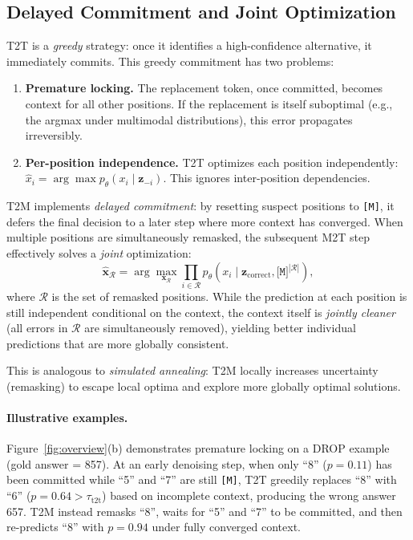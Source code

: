\documentclass{article}
\newcommand{\mask}{\texttt{[M]}}
\newcommand{\MtoT}{\textrm{M2T}}
\newcommand{\TtoT}{\textrm{T2T}}
\newcommand{\TtoM}{\textrm{T2M}}
\begin{document}
\subsection{Delayed Commitment and Joint Optimization}

\TtoT{} is a \emph{greedy} strategy: once it identifies a high-confidence alternative, it immediately commits. This greedy commitment has two problems:

\begin{enumerate}
    \item \textbf{Premature locking.} The replacement token, once committed, becomes context for all other positions. If the replacement is itself suboptimal (e.g., the argmax under multimodal distributions), this error propagates irreversibly.
    \item \textbf{Per-position independence.} \TtoT{} optimizes each position independently: $\hat{x}_i = \arg\max p_\theta(x_i \mid \mathbf{z}_{-i})$. This ignores inter-position dependencies.
\end{enumerate}

\TtoM{} implements \emph{delayed commitment}: by resetting suspect positions to \mask{}, it defers the final decision to a later step where more context has converged. When multiple positions are simultaneously remasked, the subsequent \MtoT{} step effectively solves a \emph{joint} optimization:
\begin{equation}
    \hat{\mathbf{x}}_{\mathcal{R}} = \arg\max_{\mathbf{x}_{\mathcal{R}}} \prod_{i \in \mathcal{R}} p_\theta(x_i \mid \mathbf{z}_{\text{correct}}, \mask{}^{|\mathcal{R}|}),
\end{equation}
where $\mathcal{R}$ is the set of remasked positions. While the prediction at each position is still independent conditional on the context, the context itself is \emph{jointly cleaner} (all errors in $\mathcal{R}$ are simultaneously removed), yielding better individual predictions that are more globally consistent.

This is analogous to \emph{simulated annealing}: \TtoM{} locally increases uncertainty (remasking) to escape local optima and explore more globally optimal solutions.

\paragraph{Illustrative examples.} Figure~\ref{fig:overview}(b) demonstrates premature locking on a DROP example (gold answer = 857). At an early denoising step, when only ``8'' ($p{=}0.11$) has been committed while ``5'' and ``7'' are still \mask{}, \TtoT{} greedily replaces ``8'' with ``6'' ($p{=}0.64 > \tau_{\text{t2t}}$) based on incomplete context, producing the wrong answer 657. \TtoM{} instead remasks ``8'', waits for ``5'' and ``7'' to be committed, and then re-predicts ``8'' with $p{=}0.94$ under fully converged context.
\end{document}
